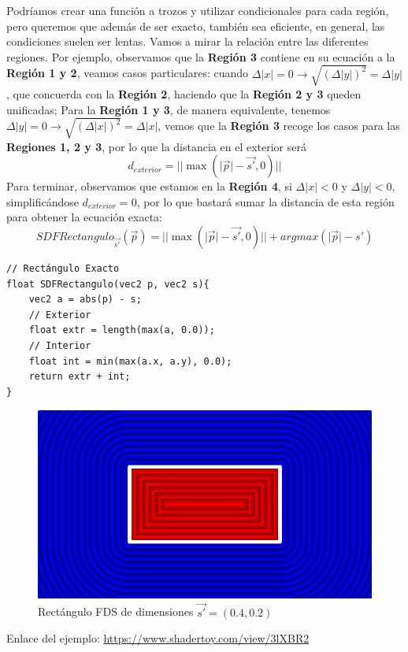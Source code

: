 Podríamos crear una función a trozos y utilizar condicionales para cada región, pero queremos que además de ser exacto, también sea eficiente, en general, las condiciones suelen ser lentas. Vamos a mirar la relación entre las diferentes regiones. Por ejemplo, observamos que la \textbf{Región 3} contiene en su ecuación a la \textbf{Región 1 y 2}, veamos casos particulares: cuando \(\Delta \vert x\vert =0\longrightarrow \sqrt{\left(\Delta\vert y\vert\right)^2} = \Delta \vert y\vert\), que concuerda con la \textbf{Región 2}, haciendo que la \textbf{Región 2 y 3} queden unificadas; Para la \textbf{Región 1 y 3}, de manera equivalente, tenemos \(\Delta \vert y\vert =0\longrightarrow \sqrt{\left(\Delta\vert x\vert\right)^2} = \Delta \vert x\vert\), vemos que la \textbf{Región 3} recoge los casos para las \textbf{Regiones 1, 2 y 3}, por lo que la distancia en el exterior será
\[d_{exterior}=\vert\vert\max\left(\vert\Vec{p}\vert-\Vec{s'},0\right)\vert\vert\]
Para terminar, observamos que estamos en la \textbf{Región 4}, si \(\Delta\vert x\vert< 0 \) y \(\Delta\vert y\vert<0\), simplificándose \(d_{exterior} = 0\), por lo que bastará sumar la distancia de esta región para obtener la ecuación exacta:
\[SDFRectangulo_{\Vec{s'}}(\Vec{p})= \vert\vert\max\left(\vert\Vec{p}\vert-\Vec{s'},0\right)\vert\vert + argmax(\vert \Vec{p}\vert - {s'})\]
\begin{lstlisting}
// Rectángulo Exacto
float SDFRectangulo(vec2 p, vec2 s){
    vec2 a = abs(p) - s;
    // Exterior
    float extr = length(max(a, 0.0));
    // Interior
    float int = min(max(a.x, a.y), 0.0);
    return extr + int;
}
\end{lstlisting}
\begin{figure}[H]
  \centering
  \captionsetup{justification=centering}%
  \includegraphics[width=1.0\textwidth]{secciones/imagenes/sdf/2d/sdf_rectangulo.png}
  \caption{Rectángulo FDS de dimensiones \(\Vec{s'}=(0.4, 0.2)\)}
  \label{fig:rectaangulo}
\end{figure}
Enlace del ejemplo: \url{https://www.shadertoy.com/view/3lXBR2}

